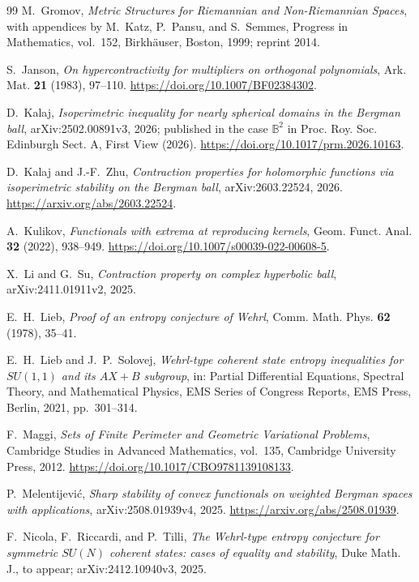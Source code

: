 \documentclass[11pt,reqno]{amsart}
\numberwithin{equation}{section}
\theoremstyle{definition}
\theoremstyle{remark}
\begin{document}
\begin{thebibliography}{99}
M.~Gromov,
\emph{Metric Structures for Riemannian and Non-Riemannian Spaces},
with appendices by M.~Katz, P.~Pansu, and S.~Semmes,
Progress in Mathematics, vol.~152,
Birkh\"auser, Boston, 1999; reprint 2014.

S.~Janson,
\emph{On hypercontractivity for multipliers on orthogonal polynomials},
Ark. Mat. \textbf{21} (1983), 97--110.
\url{https://doi.org/10.1007/BF02384302}.

D.~Kalaj,
\emph{Isoperimetric inequality for nearly spherical domains in the Bergman
ball},
arXiv:2502.00891v3, 2026; published in the case \(\mathbb B^2\) in
Proc. Roy. Soc. Edinburgh Sect. A, First View (2026).
\url{https://doi.org/10.1017/prm.2026.10163}.

D.~Kalaj and J.-F.~Zhu,
\emph{Contraction properties for holomorphic functions via isoperimetric
stability on the Bergman ball},
arXiv:2603.22524, 2026.
\url{https://arxiv.org/abs/2603.22524}.

A.~Kulikov,
\emph{Functionals with extrema at reproducing kernels},
Geom. Funct. Anal. \textbf{32} (2022), 938--949.
\url{https://doi.org/10.1007/s00039-022-00608-5}.

X.~Li and G.~Su,
\emph{Contraction property on complex hyperbolic ball},
arXiv:2411.01911v2, 2025.

E.~H.~Lieb,
\emph{Proof of an entropy conjecture of Wehrl},
Comm. Math. Phys. \textbf{62} (1978), 35--41.

E.~H.~Lieb and J.~P.~Solovej,
\emph{Wehrl-type coherent state entropy inequalities for \(SU(1,1)\) and
its \(AX+B\) subgroup},
in: Partial Differential Equations, Spectral Theory, and Mathematical
Physics, EMS Series of Congress Reports, EMS Press, Berlin, 2021,
pp.~301--314.

F.~Maggi,
\emph{Sets of Finite Perimeter and Geometric Variational Problems},
Cambridge Studies in Advanced Mathematics, vol.~135,
Cambridge University Press, 2012.
\url{https://doi.org/10.1017/CBO9781139108133}.

P.~Melentijevi\'c,
\emph{Sharp stability of convex functionals on weighted Bergman spaces with
applications},
arXiv:2508.01939v4, 2025.
\url{https://arxiv.org/abs/2508.01939}.

F.~Nicola, F.~Riccardi, and P.~Tilli,
\emph{The Wehrl-type entropy conjecture for symmetric \(SU(N)\) coherent
states: cases of equality and stability},
Duke Math. J., to appear; arXiv:2412.10940v3, 2025.


\end{thebibliography}
\end{document}
